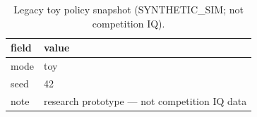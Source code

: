\begin{table}[h]\centering
\caption{Legacy toy policy snapshot (SYNTHETIC\_SIM; not competition IQ).}
\begin{tabular}{ll}\toprule field & value \\\midrule
mode & toy \\
seed & 42 \\
note & research prototype — not competition IQ data \\\bottomrule\end{tabular}\end{table}
